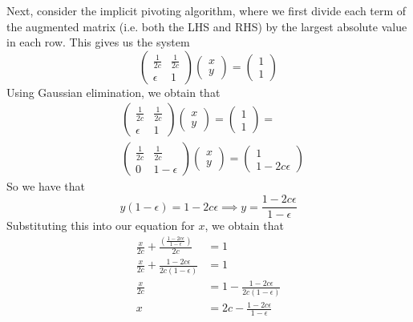 \documentclass{article}
\begin{document}
Next, consider the implicit pivoting algorithm, where we first divide each term of the augmented matrix (i.e. both the LHS and RHS) by the largest absolute value in each row. This gives us the system 
\begin{equation*}
    \begin{pmatrix}
        \frac{1}{2c}&\frac{1}{2c}\\
        \epsilon & 1
    \end{pmatrix}\begin{pmatrix}
        x\\y
    \end{pmatrix}=
    \begin{pmatrix}
        1\\1
    \end{pmatrix}
\end{equation*}
Using Gaussian elimination, we obtain that 
\begin{align*}
    &\begin{pmatrix}
        \frac{1}{2c}&\frac{1}{2c}\\
        \epsilon & 1
    \end{pmatrix}\begin{pmatrix}
        x\\y
    \end{pmatrix}=
    \begin{pmatrix}
        1\\1
    \end{pmatrix}= \\
    &\begin{pmatrix}
        \frac{1}{2c}&\frac{1}{2c}\\
        0&1-\epsilon
    \end{pmatrix}\begin{pmatrix}
        x\\y
    \end{pmatrix}=
    \begin{pmatrix}
        1\\
        1-2c\epsilon
    \end{pmatrix} 
\end{align*}
So we have that 
\begin{equation*}
    y(1-\epsilon) =1-2c\epsilon \implies y = \frac{1-2c\epsilon}{1-\epsilon}
\end{equation*}
Substituting this into our equation for $x$, we obtain that 
\begin{align*}
    \frac{x}{2c} + \frac{\left(\frac{1-2c\epsilon}{1-\epsilon}\right)}{2c} &= 1\\
    \frac{x}{2c} + \frac{1-2c\epsilon}{2c(1-\epsilon)} &= 1 \\
    \frac{x}{2c} &= 1-\frac{1-2c\epsilon}{2c(1-\epsilon)}\\
    x &= 2c - \frac{1-2c\epsilon}{1-\epsilon}
\end{align*}
\end{document}
